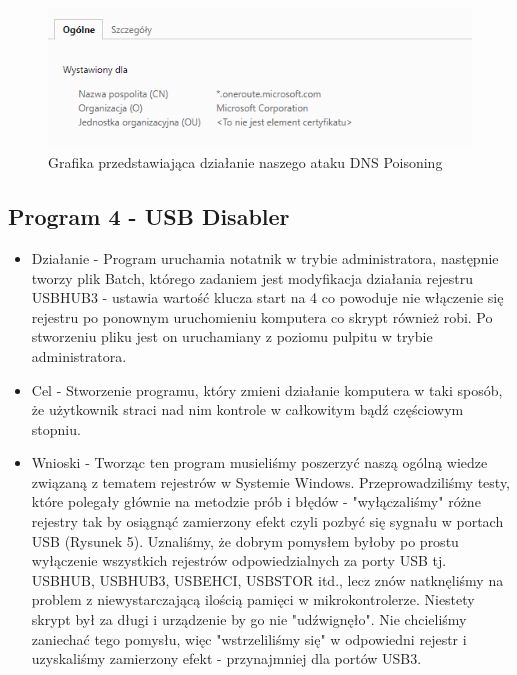 \documentclass{article}
\begin{document}
\begin{itemize}
        \begin{figure}[h]
    \centering
    \includegraphics[scale=0.5]{Media/DNS.png}
    \caption{Grafika przedstawiająca działanie naszego ataku DNS Poisoning}
    \label{fig:enter-label}
    \end{figure}
    \end{itemize}    
\subsection{Program 4 - USB Disabler}
    \begin{itemize}
        \item Działanie - Program uruchamia notatnik w trybie administratora, następnie tworzy plik Batch, którego zadaniem jest modyfikacja działania rejestru USBHUB3 - ustawia wartość klucza start na 4 co powoduje nie włączenie się rejestru po ponownym uruchomieniu komputera co skrypt również robi. Po stworzeniu pliku jest on uruchamiany z poziomu pulpitu w trybie administratora.
        \item Cel - Stworzenie programu, który zmieni działanie komputera w taki sposób, że użytkownik straci nad nim kontrole w całkowitym bądź częściowym stopniu.
        \item Wnioski - Tworząc ten program musieliśmy poszerzyć naszą ogólną wiedze związaną z tematem rejestrów w Systemie Windows. Przeprowadziliśmy testy, które polegały głównie na metodzie prób i błędów - "wyłączaliśmy" różne rejestry tak by osiągnąć zamierzony efekt czyli pozbyć się sygnału w portach USB (Rysunek 5). Uznaliśmy, że dobrym pomysłem byłoby po prostu wyłączenie wszystkich rejestrów odpowiedzialnych za porty USB tj. USBHUB, USBHUB3, USBEHCI, USBSTOR itd., lecz znów natknęliśmy na problem z niewystarczającą ilością pamięci w mikrokontrolerze. Niestety skrypt był za długi i urządzenie by go nie "udźwignęło". Nie chcieliśmy zaniechać tego pomysłu, więc "wstrzeliliśmy się" w odpowiedni rejestr i uzyskaliśmy zamierzony efekt - przynajmniej dla portów USB3.
    \end{itemize} 
\newpage
\end{document}
